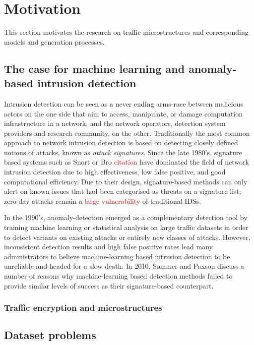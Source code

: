 \section{Motivation}

This section motivates the research on traffic microstructures and corresponding models and generation processes.

\subsection{The case for machine learning and anomaly-based intrusion detection}

Intrusion detection can be seen as a never ending arms-race between malicious actors on the one side that aim to access, manipulate, or damage computation infrastructure in a network, and the network operators, detection system providers and research community, on  the other. Traditionally the most common approach to network intrusion detection is based on detecting closely defined notions of attacks, known as \emph{attack signatures}. Since the late 1980's, signature based systems such as Snort or Bro \textcolor{red}{citation} have dominated the field of network intrusion detection due to high effectiveness, low false positive, and good computational efficiency. Due to their design, signature-based methods can only alert on known issues that had been categorised as threats on a signature list; zero-day attacks remain a \textcolor{red}{large vulnerability} of traditional IDSs.

In the 1990's, anomaly-detection emerged as a complementary detection tool by training machine learning or statistical analysis on large traffic datasets in order to detect variants on existing attacks or entirely new classes of attacks. However, inconsistent detection results and high false positive rates lead many administrators to believe machine-learning based intrusion detection to be unreliable and headed for a slow death.
In 2010, Sommer and Paxson discuss a number of reasons why machine-learning based detection methods failed to provide similar levels of success as their signature-based counterpart.



\subsubsection{Traffic encryption and microstructures}



\subsection{Dataset problems}

